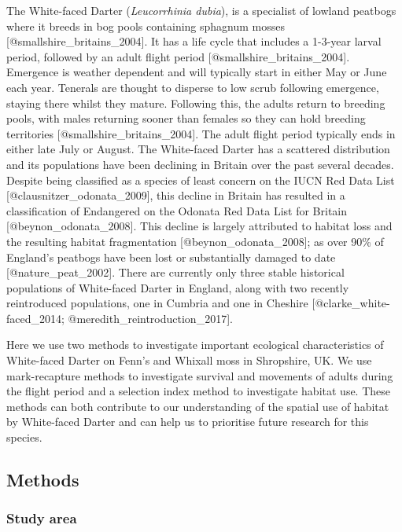 \documentclass[]{article}
\begin{document}
The White-faced Darter (\emph{Leucorrhinia dubia}), is a specialist of
lowland peatbogs where it breeds in bog pools containing sphagnum mosses
{[}@smallshire\_britains\_2004{]}. It has a life cycle that includes a
1-3-year larval period, followed by an adult flight period
{[}@smallshire\_britains\_2004{]}. Emergence is weather dependent and
will typically start in either May or June each year. Tenerals are
thought to disperse to low scrub following emergence, staying there
whilst they mature. Following this, the adults return to breeding pools,
with males returning sooner than females so they can hold breeding
territories {[}@smallshire\_britains\_2004{]}. The adult flight period
typically ends in either late July or August. The White-faced Darter has
a scattered distribution and its populations have been declining in
Britain over the past several decades. Despite being classified as a
species of least concern on the IUCN Red Data List
{[}@clausnitzer\_odonata\_2009{]}, this decline in Britain has resulted
in a classification of Endangered on the Odonata Red Data List for
Britain {[}@beynon\_odonata\_2008{]}. This decline is largely attributed
to habitat loss and the resulting habitat fragmentation
{[}@beynon\_odonata\_2008{]}; as over 90\% of England's peatbogs have
been lost or substantially damaged to date {[}@nature\_peat\_2002{]}.
There are currently only three stable historical populations of
White-faced Darter in England, along with two recently reintroduced
populations, one in Cumbria and one in Cheshire
{[}@clarke\_white-faced\_2014; @meredith\_reintroduction\_2017{]}.

Here we use two methods to investigate important ecological
characteristics of White-faced Darter on Fenn's and Whixall moss in
Shropshire, UK. We use mark-recapture methods to investigate survival
and movements of adults during the flight period and a selection index
method to investigate habitat use. These methods can both contribute to
our understanding of the spatial use of habitat by White-faced Darter
and can help us to prioritise future research for this species.

\subsection{Methods}\label{methods}

\subsubsection{Study area}\label{study-area}
\end{document}
